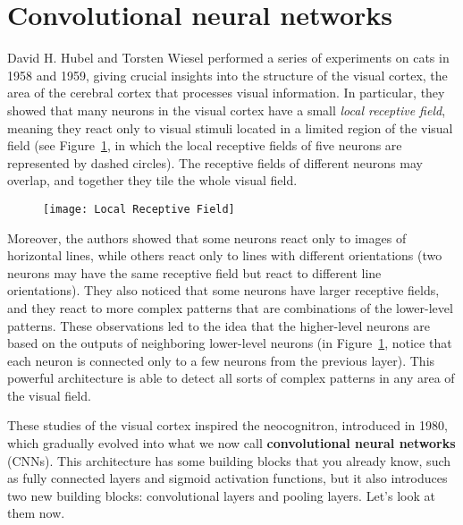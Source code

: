 \section{Convolutional neural networks}
David H. Hubel and Torsten Wiesel performed a series of experiments on cats in 1958 and 1959, giving crucial insights into the structure of the visual cortex, the area of the cerebral cortex that processes visual information. In particular, they showed that many neurons in the visual cortex have a small \emph{local receptive field}, meaning they react only to visual stimuli located in a limited region of the visual field (see Figure~\ref{LocalReceptiveField}, in which the local receptive fields of five neurons are represented by dashed circles). The receptive fields of different neurons may overlap, and together they tile the whole visual field.
\begin{figure}[h!t]
\centering
\texttt{[image: Local Receptive Field]}
\caption{}\label{LocalReceptiveField}
\end{figure}

Moreover, the authors showed that some neurons react only to images of horizontal lines, while others react only to lines with different orientations (two neurons may have the same receptive field but react to different line orientations). They also noticed that some neurons have larger receptive fields, and they react to more complex patterns that are combinations of the lower-level patterns. These observations led to the idea that the higher-level neurons are based on the outputs of neighboring lower-level neurons (in Figure~\ref{LocalReceptiveField}, notice that each neuron is connected only to a few neurons from the previous layer). This powerful architecture is able to detect all sorts of complex patterns in any area of the visual field.

These studies of the visual cortex inspired the neocognitron, introduced in 1980, which gradually evolved into what we now call \textbf{convolutional neural networks} (CNNs).
This architecture has some building blocks that you already know, such as fully connected layers and sigmoid activation functions, but it also introduces two new building blocks: convolutional layers and pooling layers. Let's look at them now.
